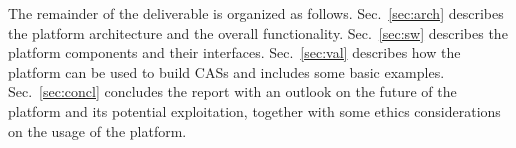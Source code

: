 
The remainder of the deliverable is organized as follows. Sec.~\ref{sec:arch} describes the platform architecture and the overall functionality. Sec.~\ref{sec:sw} describes the platform components and their interfaces. Sec.~\ref{sec:val} describes how the platform can be used to build CASs and includes some basic examples. Sec.~\ref{sec:concl} concludes the report with an outlook on the future of the platform and its potential exploitation, together with some ethics considerations on the usage of the platform.



